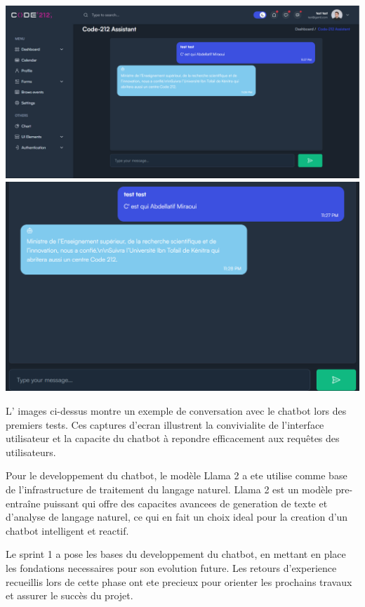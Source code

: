 \documentclass[a4paper, 11pt, openany]{report}
\begin{document}
\begin{center}
    \includegraphics[width=1\textwidth]{chat1.png}
    \includegraphics[width=1\textwidth]{chat2.png}
\end{center}

L' images ci-dessus montre un exemple de conversation avec le chatbot lors des premiers tests. Ces captures d'ecran illustrent la convivialite de l'interface utilisateur et la capacite du chatbot à repondre efficacement aux requêtes des utilisateurs.


Pour le developpement du chatbot, le modèle Llama 2 a ete utilise comme base de l'infrastructure de traitement du langage naturel. Llama 2 est un modèle pre-entraîne puissant qui offre des capacites avancees de generation de texte et d'analyse de langage naturel, ce qui en fait un choix ideal pour la creation d'un chatbot intelligent et reactif.

Le sprint 1 a pose les bases du developpement du chatbot, en mettant en place les fondations necessaires pour son evolution future. Les retours d'experience recueillis lors de cette phase ont ete precieux pour orienter les prochains travaux et assurer le succès du projet.
\end{document}
